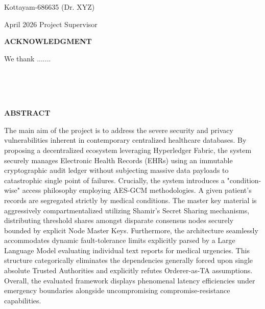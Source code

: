 \documentclass[12pt]{report}
\theoremstyle{plain}
\theoremstyle{definition}
\theoremstyle{remark}
\begin{document}
\vspace{4cm}

\noindent Kottayam-686635  \hfill (Dr. XYZ)

\noindent April 2026 \hfill Project Supervisor

\clearpage

\begin{center}
{\large{\bf{ACKNOWLEDGMENT}}}
\end{center}


\noindent We thank .......


\vspace{4cm}
\hspace*{\fill}{\large Prem (Roll No. 1234567890)}\\
\hspace*{\fill}{\large Team Member 2 (Roll No. XXXXXXXXXX)}\\
\hspace*{\fill}{\large Team Member 3 (Roll No. XXXXXXXXXX)}\\
\hspace*{\fill}{\large Team Member 4 (Roll No. XXXXXXXXXX)}						 

\clearpage


\begin{center}
{\Large{\bf{ABSTRACT}}
}
\end{center}


The main aim of the project is to address the severe security and privacy vulnerabilities inherent in contemporary centralized healthcare databases. By proposing a decentralized ecosystem leveraging Hyperledger Fabric, the system securely manages Electronic Health Records (EHRs) using an immutable cryptographic audit ledger without subjecting massive data payloads to catastrophic single point of failures. Crucially, the system introduces a "condition-wise" access philosophy employing AES-GCM methodologies. A given patient's records are segregated strictly by medical conditions. The master key material is aggressively compartmentalized utilizing Shamir's Secret Sharing mechanisms, distributing threshold shares amongst disparate consensus nodes securely bounded by explicit Node Master Keys. Furthermore, the architecture seamlessly accommodates dynamic fault-tolerance limits explicitly parsed by a Large Language Model evaluating individual text reports for medical urgencies. This structure categorically eliminates the dependencies generally forced upon single absolute Trusted Authorities and explicitly refutes Orderer-as-TA assumptions. Overall, the evaluated framework displays phenomenal latency efficiencies under emergency boundaries alongside uncompromising compromise-resistance capabilities.
\end{document}
